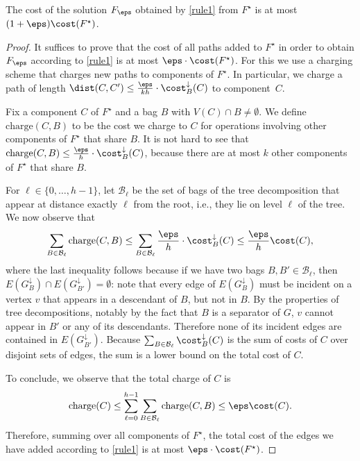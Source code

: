 \begin{lemma}\label{lem:feps}
The cost of the solution $F_\eps$ obtained by \autoref{rule1} from $F^\star$ is at most $(1+\eps)\cost(F^\star)$.
\end{lemma}

\begin{proof}
It suffices to prove that the cost of all paths added to $F^\star$ in order to obtain $F_\eps$ according to \autoref{rule1}
is at most $\eps\cdot\cost(F^\star)$.
For this we use a charging scheme that charges new paths to components of $F^\star$. 
In particular, we charge a path of length $\dist(C,C')\le\frac{\eps}{kh}\cdot\cost^\downarrow_B(C)$ to component~$C$.

Fix a component $C$ of $F^\star$ and a bag $B$ with $V(C)\cap B \neq \emptyset$. We define $\textrm{charge}(C,B)$ to be the cost we charge to $C$ for operations involving other components of $F^\star$ that share $B$. It is not hard to see that $\textrm{charge}(C,B)\le \frac{\eps}{h}\cdot \cost^\downarrow_B(C)$, because there are at most $k$ other components of $F^\star$ that share $B$. 

For $\ell\in\{0,\ldots,h-1\}$, let $\mathcal{B}_\ell$ be the set of bags of the tree decomposition that appear at distance exactly $\ell$ from the root, i.e., they lie on level $\ell$ of the tree. We now observe that
\[
\sum_{B\in\mathcal{B}_\ell}\textrm{charge}(C,B) \le \sum_{B\in\mathcal{B}_\ell}\frac{\eps}{h}\cdot \cost^\downarrow_B(C) \le \frac{\eps}{h}\cost(C),
\]
where the last inequality follows because if we have two bags $B,B'\in
\mathcal{B}_\ell$, then $E(G^\downarrow_B)\cap E(G^\downarrow_{B'})=\emptyset$:
note that every edge of $E(G^\downarrow_B)$ must be incident on a vertex $v$
that appears in a descendant of $B$, but not in $B$. By the properties of tree
decompositions, notably by the fact that $B$ is a separator of $G$, $v$ cannot
appear in $B'$ or any of its descendants.  Therefore none of its incident edges
are contained in $E(G^\downarrow_{B'})$.  Because
$\sum_{B\in\mathcal{B}_\ell}\cost^\downarrow_B(C)$ is the sum of costs of $C$
over disjoint sets of edges, the sum is a lower bound on the total cost of $C$.

To conclude, we observe that the total charge of $C$ is 
\[
\textrm{charge}(C)\le \sum_{\ell=0}^{h-1}\sum_{B\in\mathcal{B}_\ell}\textrm{charge}(C,B) \le \eps\cost(C).
\]
Therefore, summing over all components of $F^\star$, the total cost of the edges we have added according to \autoref{rule1} is at most $\eps\cdot\cost(F^\star)$.
\end{proof}

